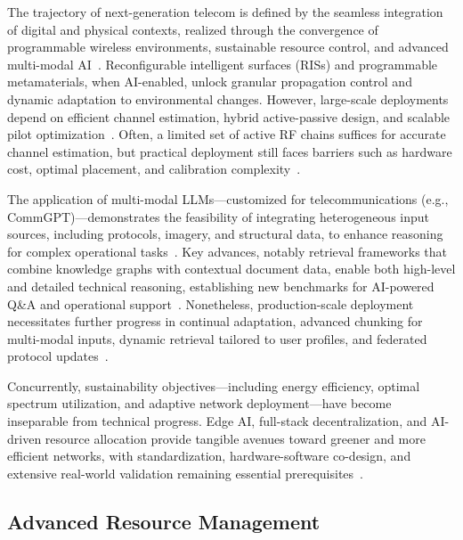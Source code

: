 The trajectory of next-generation telecom is defined by the seamless integration of digital and physical contexts, realized through the convergence of programmable wireless environments, sustainable resource control, and advanced multi-modal AI~\cite{ref7,ref10,ref17,ref18,ref19,ref20,ref21,ref22,ref23,ref24,ref25,ref26,ref27,ref28,ref29,ref30,ref35,ref39,ref40}. Reconfigurable intelligent surfaces (RISs) and programmable metamaterials, when AI-enabled, unlock granular propagation control and dynamic adaptation to environmental changes. However, large-scale deployments depend on efficient channel estimation, hybrid active-passive design, and scalable pilot optimization~\cite{ref27,ref29,ref30,ref39,ref40}. Often, a limited set of active RF chains suffices for accurate channel estimation, but practical deployment still faces barriers such as hardware cost, optimal placement, and calibration complexity~\cite{ref27,ref29,ref30}.

The application of multi-modal LLMs---customized for telecommunications (e.g., CommGPT)---demonstrates the feasibility of integrating heterogeneous input sources, including protocols, imagery, and structural data, to enhance reasoning for complex operational tasks~\cite{ref26,ref35}. Key advances, notably retrieval frameworks that combine knowledge graphs with contextual document data, enable both high-level and detailed technical reasoning, establishing new benchmarks for AI-powered Q\&A and operational support~\cite{ref26,ref35}. Nonetheless, production-scale deployment necessitates further progress in continual adaptation, advanced chunking for multi-modal inputs, dynamic retrieval tailored to user profiles, and federated protocol updates~\cite{ref26,ref35}.

Concurrently, sustainability objectives---including energy efficiency, optimal spectrum utilization, and adaptive network deployment---have become inseparable from technical progress. Edge AI, full-stack decentralization, and AI-driven resource allocation provide tangible avenues toward greener and more efficient networks, with standardization, hardware-software co-design, and extensive real-world validation remaining essential prerequisites~\cite{ref17,ref18,ref26,ref28,ref29,ref30,ref35,ref39,ref40}.

\subsection{Advanced Resource Management}

